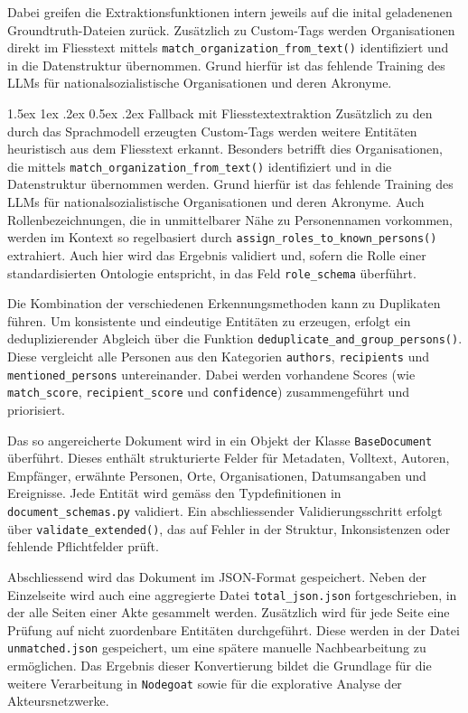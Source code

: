 \documentclass[12pt, a4paper, ngerman, bidi=default]{article}
\makeatletter
\newcommand{\code}[1]{\colorbox{VeryLightGray}{\texttt{#1}}} %
\let\oldparagraph\paragraph%
\renewcommand{\paragraph}{
    \@ifstar%
      \xxxParagraphStar%
      \xxxParagraphNoStar%
 }
\newcommand{\xxxParagraphStar}[1]{\oldparagraph*{#1}\mbox{}}
\newcommand{\xxxParagraphNoStar}[1]{\oldparagraph{#1}\mbox{}}
\renewcommand\paragraph{\@startsection{paragraph}{4}{0em}%
  {1.5ex \@plus1ex \@minus.2ex}%
  {0.5ex \@plus.2ex}%
  {\normalfont\normalsize\bfseries\itshape}}
\makeatother
\begin{document}
Dabei greifen die Extraktionsfunktionen intern jeweils auf die inital geladenenen Groundtruth-Dateien zurück.
Zusätzlich zu Custom-Tags werden Organisationen direkt im Fliesstext mittels \texttt{match\_organization\_from\_text()} identifiziert und in die Datenstruktur übernommen. Grund hierfür ist das fehlende Training des LLMs für nationalsozialistische Organisationen und deren Akronyme. 

\paragraph{Fallback mit Fliesstextextraktion}
Zusätzlich zu den durch das Sprachmodell erzeugten Custom-Tags werden weitere Entitäten heuristisch aus dem Fliesstext erkannt. 
Besonders betrifft dies Organisationen, die mittels \code{match\_organization\_from\_text()} identifiziert und in die Datenstruktur übernommen werden. Grund hierfür ist das fehlende Training des LLMs für nationalsozialistische Organisationen und deren Akronyme. Auch Rollenbezeichnungen, die in unmittelbarer Nähe zu Personennamen vorkommen, werden  im Kontext so regelbasiert durch \code{assign\_roles\_to\_known\_persons()} extrahiert. Auch hier wird das Ergebnis validiert 
und, sofern die Rolle einer standardisierten Ontologie entspricht, in das Feld \code{role\_schema} überführt.


Die Kombination der verschiedenen Erkennungsmethoden kann zu Duplikaten führen. Um konsistente und eindeutige Entitäten zu erzeugen, 
erfolgt ein deduplizierender Abgleich über die Funktion \code{deduplicate\_and\_group\_persons()}. Diese vergleicht alle Personen 
aus den Kategorien \code{authors}, \code{recipients} und \code{mentioned\_persons} untereinander. Dabei werden vorhandene Scores 
(wie \code{match\_score}, \code{recipient\_score} und \code{confidence}) zusammengeführt und priorisiert.

Das so angereicherte Dokument wird in ein Objekt der Klasse \code{BaseDocument} überführt. Dieses enthält strukturierte Felder für 
Metadaten, Volltext, Autoren, Empfänger, erwähnte Personen, Orte, Organisationen, Datumsangaben und Ereignisse. Jede Entität wird gemäss 
den Typdefinitionen in \code{document\_schemas.py} validiert. Ein abschliessender Validierungsschritt erfolgt über 
\code{validate\_extended()}, das auf Fehler in der Struktur, Inkonsistenzen oder fehlende Pflichtfelder prüft.


Abschliessend wird das Dokument im JSON-Format gespeichert. Neben der Einzelseite wird auch eine aggregierte Datei 
\code{total\_json.json} fortgeschrieben, in der alle Seiten einer Akte gesammelt werden. Zusätzlich wird für jede Seite 
eine Prüfung auf nicht zuordenbare Entitäten durchgeführt. Diese werden in der Datei \code{unmatched.json} gespeichert, 
um eine spätere manuelle Nachbearbeitung zu ermöglichen. Das Ergebnis dieser Konvertierung bildet die Grundlage für die weitere 
Verarbeitung in \code{Nodegoat} sowie für die explorative Analyse der Akteursnetzwerke.
\end{document}
